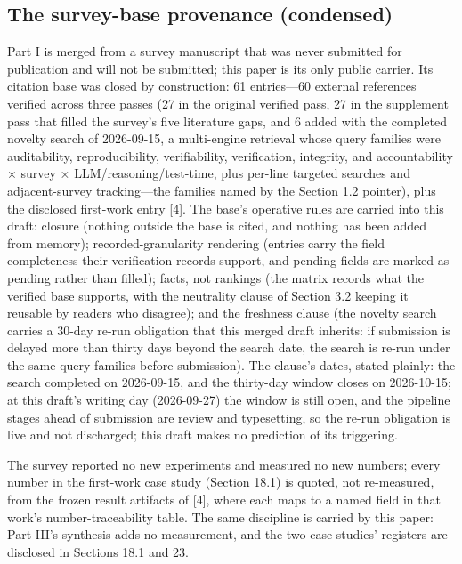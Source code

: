 \documentclass[11pt]{article}
\begin{document}
\subsection{The survey-base provenance (condensed)}
\noindent Part I is merged from a survey manuscript that was never submitted for publication and will not be submitted; this paper is its only public carrier. Its citation base was closed by construction: 61 entries—60 external references verified across three passes (27 in the original verified pass, 27 in the supplement pass that filled the survey's five literature gaps, and 6 added with the completed novelty search of 2026-09-15, a multi-engine retrieval whose query families were auditability, reproducibility, verifiability, verification, integrity, and accountability × survey × LLM/reasoning/test-time, plus per-line targeted searches and adjacent-survey tracking—the families named by the Section 1.2 pointer), plus the disclosed first-work entry [4]. The base's operative rules are carried into this draft: closure (nothing outside the base is cited, and nothing has been added from memory); recorded-granularity rendering (entries carry the field completeness their verification records support, and pending fields are marked as pending rather than filled); facts, not rankings (the matrix records what the verified base supports, with the neutrality clause of Section 3.2 keeping it reusable by readers who disagree); and the freshness clause (the novelty search carries a 30-day re-run obligation that this merged draft inherits: if submission is delayed more than thirty days beyond the search date, the search is re-run under the same query families before submission). The clause's dates, stated plainly: the search completed on 2026-09-15, and the thirty-day window closes on 2026-10-15; at this draft's writing day (2026-09-27) the window is still open, and the pipeline stages ahead of submission are review and typesetting, so the re-run obligation is live and not discharged; this draft makes no prediction of its triggering.\par
\noindent The survey reported no new experiments and measured no new numbers; every number in the first-work case study (Section 18.1) is quoted, not re-measured, from the frozen result artifacts of [4], where each maps to a named field in that work's number-traceability table. The same discipline is carried by this paper: Part III's synthesis adds no measurement, and the two case studies' registers are disclosed in Sections 18.1 and 23.\par
\end{document}
